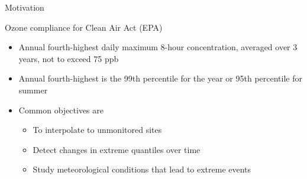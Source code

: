 \documentclass{beamer}
\begin{document}
\begin{frame}{Motivation}
\begin{adjustwidth}{1em}{0em}
  Ozone compliance for Clean Air Act (EPA) \vspace{1em}
  \begin{itemize} \setlength{\itemsep}{1em}
    \item Annual fourth-highest daily maximum 8-hour concentration, averaged over 3 years, not to exceed 75 ppb
    \item Annual fourth-highest is the 99th percentile for the year or 95th percentile for summer
    \item Common objectives are \vspace{0.5em}
    \begin{itemize} \setlength{\itemsep}{0.5em}
      \item To interpolate to unmonitored sites
      \item Detect changes in extreme quantiles over time
      \item Study meteorological conditions that lead to extreme events
    \end{itemize}
  \end{itemize}
\end{adjustwidth}
\end{frame}
\end{document}
